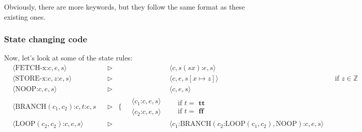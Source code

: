 \documentclass[11pt,a4paper,titlepage,dvipsnames,cmyk]{scrartcl}
\begin{document}
Obviously, there are more keywords, but they follow the same format as
these existing ones.

\subsubsection{State changing code}%
\label{ssub:code-2}
Now, let's look at some of the state rules:
\begin{align*}
    &\langle \text{FETCH-x:}c, e, s \rangle & &\triangleright & &\langle c,
    s(s x)\text{:}e, s \rangle \\
    &\langle \text{STORE-x:}c, z\text{:}e, s \rangle & &\triangleright &
    &\langle c, e, s[x \mapsto z] \rangle & &\text{if } z \in \mathbb{Z} \\
    &\langle \text{NOOP:}c, e, s \rangle & &\triangleright & &\langle c,
    e, s \rangle \\
    &\langle \text{BRANCH}(c_1, c_2)\text{:}c, t\text{:}e, s
    & &\triangleright &\bigg \{ \
    \begin{split}
    &\langle c_1 \text{:} c, e, s \rangle 
    \\
    & \langle c_2 \text{:} c, e, s \rangle 
    \end{split}
    &\begin{split}
        &\text{if } t = \textbf{ tt} \\
        &\text{if } t = \textbf{ ff}
    \end{split} \\
    &\langle \text{LOOP}(c_2, c_2) \text{:}c, e, s \rangle &
    &\triangleright & &\langle c_1
\text{:BRANCH}(c_2\text{:LOOP}(c_1,c_2), \text{NOOP})\text{:}c, e, s\rangle
\end{align*}
\end{document}
